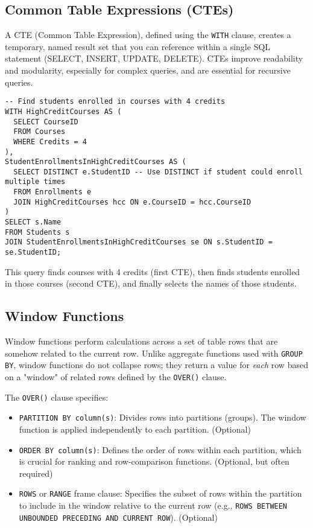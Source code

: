 \documentclass[12pt]{book}
\begin{document}
\subsection{Common Table Expressions (CTEs)}

A CTE (Common Table Expression), defined using the \texttt{WITH} clause, creates a temporary, named result set that you can reference within a single SQL statement (SELECT, INSERT, UPDATE, DELETE). CTEs improve readability and modularity, especially for complex queries, and are essential for recursive queries.

\begin{lstlisting}[caption={CTE Example}, label=lst:cte_example]
-- Find students enrolled in courses with 4 credits
WITH HighCreditCourses AS (
  SELECT CourseID
  FROM Courses
  WHERE Credits = 4
),
StudentEnrollmentsInHighCreditCourses AS (
  SELECT DISTINCT e.StudentID -- Use DISTINCT if student could enroll multiple times
  FROM Enrollments e
  JOIN HighCreditCourses hcc ON e.CourseID = hcc.CourseID
)
SELECT s.Name
FROM Students s
JOIN StudentEnrollmentsInHighCreditCourses se ON s.StudentID = se.StudentID;
\end{lstlisting}
This query finds courses with 4 credits (first CTE), then finds students enrolled in those courses (second CTE), and finally selects the names of those students.

\subsection{Window Functions}

Window functions perform calculations across a set of table rows that are somehow related to the current row. Unlike aggregate functions used with \texttt{GROUP BY}, window functions do not collapse rows; they return a value for \emph{each} row based on a "window" of related rows defined by the \texttt{OVER()} clause.

The \texttt{OVER()} clause specifies:
\begin{itemize}
    \item \texttt{PARTITION BY column(s)}: Divides rows into partitions (groups). The window function is applied independently to each partition. (Optional)
    \item \texttt{ORDER BY column(s)}: Defines the order of rows within each partition, which is crucial for ranking and row-comparison functions. (Optional, but often required)
    \item \texttt{ROWS} or \texttt{RANGE} frame clause: Specifies the subset of rows within the partition to include in the window relative to the current row (e.g., \texttt{ROWS BETWEEN UNBOUNDED PRECEDING AND CURRENT ROW}). (Optional)
\end{itemize}
\end{document}
